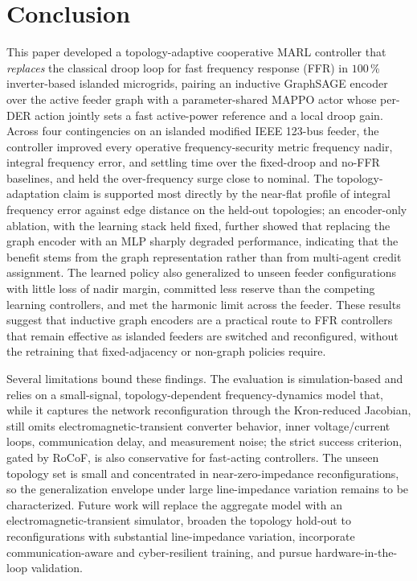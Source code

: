 \documentclass[lettersize,journal]{IEEEtran}
\begin{document}
\section{Conclusion} \label{sec:conclusion}
This paper developed a topology-adaptive cooperative MARL controller that \emph{replaces} the classical droop loop for fast frequency response (FFR) in $100$\,\% inverter-based islanded microgrids, pairing an inductive GraphSAGE encoder over the active feeder graph with a parameter-shared MAPPO actor whose per-DER action jointly sets a fast active-power reference and a local droop gain. Across four contingencies on an islanded modified IEEE 123-bus feeder, the controller improved every operative frequency-security metric frequency nadir, integral frequency error, and settling time over the fixed-droop and no-FFR baselines, and held the over-frequency surge close to nominal. The topology-adaptation claim is supported most directly by the near-flat profile of integral frequency error against edge distance on the held-out topologies; an encoder-only ablation, with the learning stack held fixed, further showed that replacing the graph encoder with an MLP sharply degraded performance,
indicating that the benefit stems from the graph representation rather than from multi-agent credit assignment. The learned policy also generalized to unseen feeder configurations with little loss of nadir margin, committed less reserve than the competing learning controllers, and met the harmonic limit across the feeder. These results suggest that inductive graph encoders are a practical route to FFR controllers that remain effective as islanded feeders are switched and reconfigured, without the retraining that fixed-adjacency or non-graph policies require.

Several limitations bound these findings. The evaluation is simulation-based and relies on a small-signal, topology-dependent
frequency-dynamics model that, while it captures the network reconfiguration through the Kron-reduced Jacobian, still omits
electromagnetic-transient converter behavior, inner voltage/current loops, communication delay, and measurement noise; the strict success criterion, gated by RoCoF, is also conservative for fast-acting controllers. The unseen
topology set is small and concentrated in near-zero-impedance reconfigurations, so the generalization envelope under large
line-impedance variation remains to be characterized. Future work will replace the aggregate model with an electromagnetic-transient simulator, broaden the topology hold-out to reconfigurations with substantial line-impedance variation, incorporate communication-aware and cyber-resilient training, and pursue hardware-in-the-loop validation.
\end{document}
